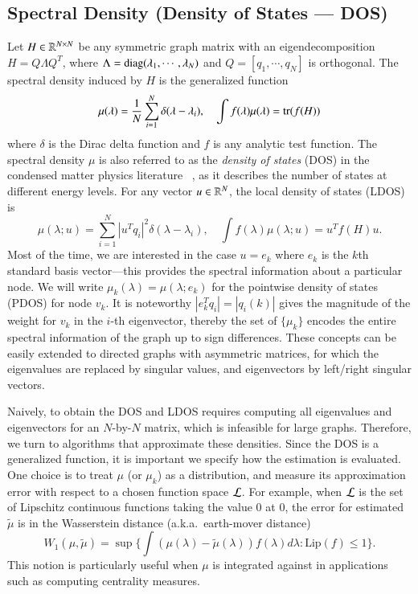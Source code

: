\subsection{Spectral Density (Density of States --- DOS)}
Let $H\in\mathbb{R}^{N\times N}$ be any symmetric graph matrix with an
eigendecomposition $H = Q\Lambda Q^T$, where $\Lambda = \operatorname{diag} 
(\lambda_1,\cdots,\lambda_N)$ and $Q = [q_1,\cdots, q_N]$ is orthogonal. The
spectral density induced by $H$ is the generalized function
\begin{equation}\label{eqn:dos}
  \mu(\lambda) = \frac{1}{N}\sum_{i=1}^N \delta(\lambda - \lambda_i), \quad \int
  f(\lambda) \mu(\lambda) = \operatorname{tr}(f(H))
\end{equation}
where $\delta$ is the Dirac delta function and $f$ is any analytic test
function. The spectral density $\mu$ is also referred to as the \emph{density
of states} (DOS) in the condensed matter physics literature~
\cite{weisse2006kernel}, as it describes the number of states at different
energy levels. For any vector $u\in\mathbb{R}^N$, the local density of states (LDOS)
is
\begin{equation}\label{eqn:ldos}
  \mu(\lambda; u) = \sum_{i=1}^N|u^Tq_i|^2\delta(\lambda-\lambda_i), \quad \int
  f(\lambda)\mu(\lambda; u) = u^T f(H) u.
\end{equation}
Most of the time, we are interested in the case $u=e_k$ where $e_k$ is the $k$th
standard basis vector---this provides the spectral information about a
particular node. We will write $\mu_k(\lambda) = \mu(\lambda; e_k)$ for the
pointwise density of states (PDOS) for node $v_k$. It is noteworthy $|e_k^Tq_i|
= |q_i(k)|$ gives the magnitude of the weight for $v_k$ in the $i$-th
eigenvector, thereby the set of $\{\mu_k\}$ encodes the entire spectral
information of the graph up to sign differences. These concepts can be easily
extended to directed graphs with asymmetric matrices, for which the eigenvalues
are replaced by singular values, and eigenvectors by left/right singular
vectors.

Naively, to obtain the DOS and LDOS requires computing all eigenvalues and
eigenvectors for an $N$\hyp{}by\hyp{}$N$ matrix, which is infeasible for large
graphs. Therefore, we turn to algorithms that approximate these densities. Since
the DOS is a generalized function, it is important we specify how the estimation
is evaluated. One choice is to treat $\mu$ (or $\mu_k$) as a distribution, and
measure its  approximation error with respect to a chosen function space
$\mathcal{L}$. For  example, when $\mathcal{L}$ is the set of Lipschitz continuous functions
taking the value 0 at 0, the error for estimated $\widetilde{\mu}$ is in the
Wasserstein distance (a.k.a.\ earth-mover distance)~\cite{kantorovich1958space}
\begin{equation}\label{eqn:waisserstein}
W_1(\mu,\widetilde{\mu}) = \sup\Big\{\int (\mu(\lambda)-\widetilde{\mu}(\lambda
))f(\lambda)d\lambda : \text{Lip}(f)\leq 1\Big\}.
\end{equation}
This notion is particularly useful when $\mu$ is integrated against in 
applications such as computing centrality measures.

